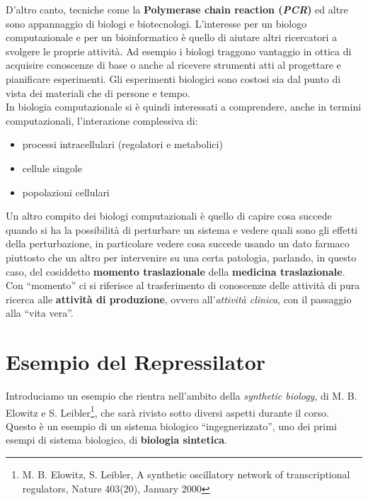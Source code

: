 \documentclass[a4paper,12pt, oneside]{book}
\begin{document}
D'altro canto, tecniche come la \textbf{Polymerase chain reaction
  (\textit{PCR})} ed altre sono appannaggio di biologi e biotecnologi.
L'interesse per un biologo computazionale e per un bioinformatico è quello di
aiutare altri ricercatori a svolgere le proprie attività. Ad esempio i biologi
traggono vantaggio in ottica di acquisire conoscenze di base o anche al ricevere
strumenti atti al progettare e pianificare esperimenti. Gli esperimenti
biologici sono costosi sia dal punto di vista dei materiali che di persone e
tempo. \\
In biologia computazionale si è quindi interessati a comprendere, anche in
termini computazionali, l'interazione complessiva di:
\begin{itemize}
  \item processi intracellulari (regolatori e metabolici)
  \item cellule singole
  \item popolazioni cellulari 
\end{itemize}
Un altro compito dei biologi computazionali è quello di capire cosa
succede quando si ha la possibilità di perturbare un sistema e vedere quali sono
gli effetti della perturbazione, in particolare vedere cosa succede usando un
dato farmaco piuttosto che un altro per intervenire su una certa patologia,
parlando, in questo caso, del cosiddetto \textbf{momento traslazionale} della
\textbf{medicina traslazionale}. Con ``momento'' ci si riferisce al
trasferimento di conoscenze delle attività di pura ricerca alle \textbf{attività
  di produzione}, ovvero all'\textit{attività clinica}, con il passaggio alla
``vita vera''.
\chapter{Esempio del Repressilator}
Introduciamo un esempio che rientra nell'ambito della \textit{synthetic
  biology}, di M. B. Elowitz e S. Leibler\footnote{M. B. Elowitz, 
  S. Leibler, A synthetic oscillatory network of transcriptional regulators,
  Nature 403(20), January 2000},  che sarà rivisto sotto diversi aspetti durante
il corso. Questo è un esempio di un sistema biologico ``ingegnerizzato'', uno
dei primi esempi di sistema biologico, di \textbf{biologia sintetica}.
\end{document}
